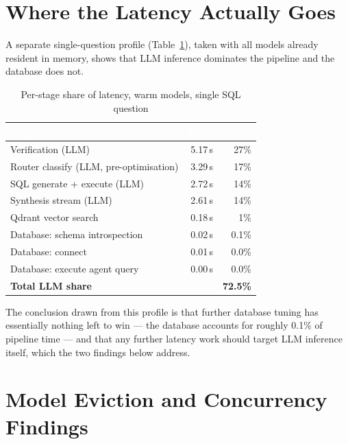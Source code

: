 \documentclass[11pt,a4paper,oneside]{report}
\begin{document}
\section{Where the Latency Actually Goes}

A separate single-question profile (Table~\ref{tab:profile}), taken with all
models already resident in memory, shows that LLM inference dominates the
pipeline and the database does not.

\begin{table}[h]
\centering
\caption{Per-stage share of latency, warm models, single SQL question}
\label{tab:profile}
\renewcommand{\arraystretch}{1.3}
\begin{tabular}{|l|r|r|}
\hline
\rowcolor{hdrnavy}
\textcolor{white}{Stage} & \textcolor{white}{Time} & \textcolor{white}{Share} \\
\hline
Verification (LLM) & 5.17\,s & 27\% \\
\hline
Router classify (LLM, pre-optimisation) & 3.29\,s & 17\% \\
\hline
SQL generate + execute (LLM) & 2.72\,s & 14\% \\
\hline
Synthesis stream (LLM) & 2.61\,s & 14\% \\
\hline
Qdrant vector search & 0.18\,s & 1\% \\
\hline
Database: schema introspection & 0.02\,s & 0.1\% \\
\hline
Database: connect & 0.01\,s & 0.0\% \\
\hline
Database: execute agent query & 0.00\,s & 0.0\% \\
\hline
\rowcolor{hdrblue}
\textbf{Total LLM share} & & \textbf{72.5\%} \\
\hline
\end{tabular}
\end{table}

The conclusion drawn from this profile is that further database tuning has
essentially nothing left to win --- the database accounts for roughly 0.1\%
of pipeline time --- and that any further latency work should target LLM
inference itself, which the two findings below address.

\section{Model Eviction and Concurrency Findings}
\end{document}
